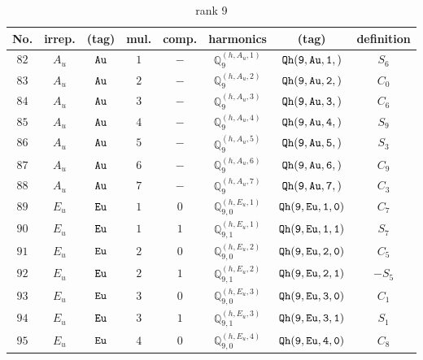 \documentclass[fleqn,8pt]{jsarticle}
\begin{document}
\begin{table}[ht!]
\begin{center}
\caption{rank 9}
\renewcommand{\arraystretch}{1.3}
\begin{tabular}{cccccccc} \hline \hline
No. & irrep. & (tag) & mul. & comp. & harmonics & (tag) & definition \\ \hline
$ 82 $ & $ A_{u} $ & $ {\tt Au} $ & $ 1 $ & $ - $ & $ \mathbb{Q}_{9}^{(h,A_{u},1)} $ & $ {\tt Qh(9,Au,1,)} $ & $ S_{6} $ \\
$ 83 $ & $ A_{u} $ & $ {\tt Au} $ & $ 2 $ & $ - $ & $ \mathbb{Q}_{9}^{(h,A_{u},2)} $ & $ {\tt Qh(9,Au,2,)} $ & $ C_{0} $ \\
$ 84 $ & $ A_{u} $ & $ {\tt Au} $ & $ 3 $ & $ - $ & $ \mathbb{Q}_{9}^{(h,A_{u},3)} $ & $ {\tt Qh(9,Au,3,)} $ & $ C_{6} $ \\
$ 85 $ & $ A_{u} $ & $ {\tt Au} $ & $ 4 $ & $ - $ & $ \mathbb{Q}_{9}^{(h,A_{u},4)} $ & $ {\tt Qh(9,Au,4,)} $ & $ S_{9} $ \\
$ 86 $ & $ A_{u} $ & $ {\tt Au} $ & $ 5 $ & $ - $ & $ \mathbb{Q}_{9}^{(h,A_{u},5)} $ & $ {\tt Qh(9,Au,5,)} $ & $ S_{3} $ \\
$ 87 $ & $ A_{u} $ & $ {\tt Au} $ & $ 6 $ & $ - $ & $ \mathbb{Q}_{9}^{(h,A_{u},6)} $ & $ {\tt Qh(9,Au,6,)} $ & $ C_{9} $ \\
$ 88 $ & $ A_{u} $ & $ {\tt Au} $ & $ 7 $ & $ - $ & $ \mathbb{Q}_{9}^{(h,A_{u},7)} $ & $ {\tt Qh(9,Au,7,)} $ & $ C_{3} $ \\
$ 89 $ & $ E_{u} $ & $ {\tt Eu} $ & $ 1 $ & $ 0 $ & $ \mathbb{Q}_{9,0}^{(h,E_{u},1)} $ & $ {\tt Qh(9,Eu,1,0)} $ & $ C_{7} $ \\
$ 90 $ & $ E_{u} $ & $ {\tt Eu} $ & $ 1 $ & $ 1 $ & $ \mathbb{Q}_{9,1}^{(h,E_{u},1)} $ & $ {\tt Qh(9,Eu,1,1)} $ & $ S_{7} $ \\
$ 91 $ & $ E_{u} $ & $ {\tt Eu} $ & $ 2 $ & $ 0 $ & $ \mathbb{Q}_{9,0}^{(h,E_{u},2)} $ & $ {\tt Qh(9,Eu,2,0)} $ & $ C_{5} $ \\
$ 92 $ & $ E_{u} $ & $ {\tt Eu} $ & $ 2 $ & $ 1 $ & $ \mathbb{Q}_{9,1}^{(h,E_{u},2)} $ & $ {\tt Qh(9,Eu,2,1)} $ & $ - S_{5} $ \\
$ 93 $ & $ E_{u} $ & $ {\tt Eu} $ & $ 3 $ & $ 0 $ & $ \mathbb{Q}_{9,0}^{(h,E_{u},3)} $ & $ {\tt Qh(9,Eu,3,0)} $ & $ C_{1} $ \\
$ 94 $ & $ E_{u} $ & $ {\tt Eu} $ & $ 3 $ & $ 1 $ & $ \mathbb{Q}_{9,1}^{(h,E_{u},3)} $ & $ {\tt Qh(9,Eu,3,1)} $ & $ S_{1} $ \\
$ 95 $ & $ E_{u} $ & $ {\tt Eu} $ & $ 4 $ & $ 0 $ & $ \mathbb{Q}_{9,0}^{(h,E_{u},4)} $ & $ {\tt Qh(9,Eu,4,0)} $ & $ C_{8} $ \\

\end{tabular}
\end{center}
\end{table}
\end{document}
